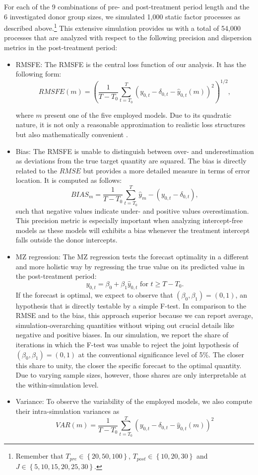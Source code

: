 For each of the 9 combinations of pre- and post-treatment period length and the 6 investigated donor group sizes, we simulated 1,000 static factor processes as described above.\footnote{Remember that $T_{pre} \in \left\lbrace 20,50,100\right\rbrace $, $T_{post} \in \left\lbrace 10,20,30\right\rbrace$ and $J \in \left\lbrace 5,10,15,20,25,30\right\rbrace$.} This extensive simulation provides us with a total of 54,000 processes that are analyzed with respect to the following precision and dispersion metrics in the post-treatment period:
\begin{itemize}
	\item \ac{RMSFE}: The \ac{RMSFE} is the central loss function of our analysis. It has the following form:
	$$RMSFE(m) = \left(\frac{1}{T - T_0} \sum_{t = T_0}^{T} \left( y_{0,t} - \delta_{0,t} - \widehat{y}_{0,t}(m)\right) ^2 \right)^{1/2},$$
	
	where $m$ present one of the five employed models. Due to its quadratic nature, it is not only a reasonable approximation to realistic loss structures but also mathematically convenient \cite{diebold:2017}. 
	\item Bias: The \ac{RMSFE} is unable to distinguish between over- and underestimation as deviations from the true target quantity are squared. The bias is directly related to the $RMSE$ but provides a more detailed measure in terms of error location. It is computed as follows:
	$$BIAS_m = \frac{1}{T - T_0} \sum_{t = T_0}^{T} \widehat{y}_m - (y_{0,t} - \delta_{0,t}),$$
	such that negative values indicate under- and positive values overestimation. This precision metric is especially important when analyzing intercept-free models as these models will exhibits a bias whenever the treatment intercept falls outside the donor intercepts. 
	\item \ac{MZ} regression: The \ac{MZ} regression tests the forecast optimality in a different and more holistic way by regressing the true value on its predicted value in the post-treatment period: 
	$$y_{0,t} = \beta_0 + \beta_1 \widehat{y}_{0,t} \text{ for } t \geq T- T_0.$$
	If the forecast is optimal, we expect to observe that $(\beta_0, \beta_1) = (0,1)$, an hypothesis that is directly testable by a simple F-test. In comparison to the RMSE and to the bias, this approach superior because we can report average, simulation-overarching quantities without wiping out crucial details like negative and positive biases. In our simulation, we report the share of iterations in which the F-test was unable to reject the joint hypothesis of $(\beta_0, \beta_1) = (0,1)$ at the conventional significance level of 5\%. The closer this share to unity, the closer the specific forecast to the optimal quantity. Due to varying sample sizes, however, those shares are only interpretable at the within-simulation level.
	
	\item Variance: To observe the variability of the employed models, we also compute their intra-simulation variances as
	$$VAR(m) = \frac{1}{T - T_0} \sum_{t = T_0}^{T} \left( y_{0,t} - \delta_{0,t} - \widehat{y}_{0,t}(m)\right) ^2 $$

\end{itemize}
